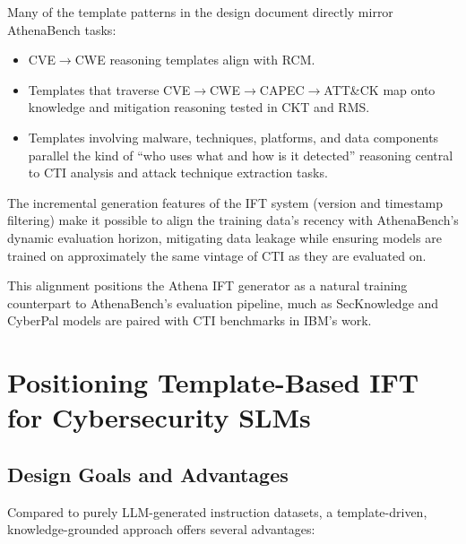 \documentclass[10pt]{article}
\begin{document}
Many of the template patterns in the design document directly mirror AthenaBench tasks:
\begin{itemize}[leftmargin=*]
  \item CVE$\rightarrow$CWE reasoning templates align with RCM.
  \item Templates that traverse CVE$\rightarrow$CWE$\rightarrow$CAPEC$\rightarrow$ATT\&CK map onto knowledge and mitigation reasoning tested in CKT and RMS.
  \item Templates involving malware, techniques, platforms, and data components parallel the kind of ``who uses what and how is it detected'' reasoning central to CTI analysis and attack technique extraction tasks.\cite{cardei2025ift}
\end{itemize}

The incremental generation features of the IFT system (version and timestamp filtering) make it possible to align the training data’s recency with AthenaBench’s dynamic evaluation horizon, mitigating data leakage while ensuring models are trained on approximately the same vintage of CTI as they are evaluated on.\cite{cardei2025ift,alam2025athenabench}

This alignment positions the Athena IFT generator as a natural training counterpart to AthenaBench’s evaluation pipeline, much as SecKnowledge and CyberPal models are paired with CTI benchmarks in IBM’s work.\cite{levi2024cyberpal,levi2025toward}

\section{Positioning Template-Based IFT for Cybersecurity SLMs}
\label{sec:athena-ift}

\subsection{Design Goals and Advantages}

Compared to purely LLM-generated instruction datasets, a template-driven, knowledge-grounded approach offers several advantages:
\end{document}
